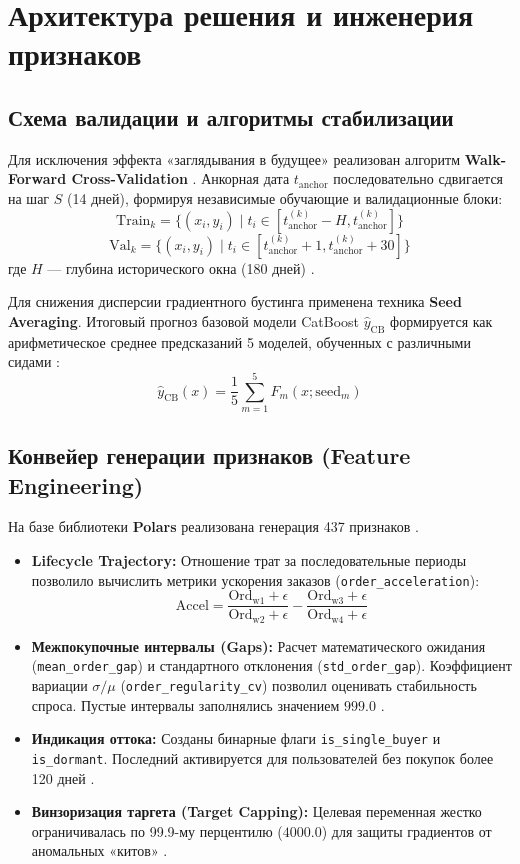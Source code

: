 \documentclass[12pt, a4paper]{article}
\begin{document}
	\section{Архитектура решения и инженерия признаков}
	
	\subsection{Схема валидации и алгоритмы стабилизации}
	Для исключения эффекта «заглядывания в будущее» реализован алгоритм \textbf{Walk-Forward Cross-Validation} \cite{ref:data}.
	Анкорная дата $t_{\text{anchor}}$ последовательно сдвигается на шаг $S$ (14 дней), формируя независимые обучающие и валидационные блоки:
	$$ \text{Train}_k = \{ (x_i, y_i) \mid t_i \in [t_{\text{anchor}}^{(k)} - H, t_{\text{anchor}}^{(k)}] \} $$
	$$ \text{Val}_k = \{ (x_i, y_i) \mid t_i \in [t_{\text{anchor}}^{(k)} + 1, t_{\text{anchor}}^{(k)} + 30] \} $$
	где $H$ — глубина исторического окна (180 дней) \cite{ref:data}.
	
	Для снижения дисперсии градиентного бустинга применена техника \textbf{Seed Averaging}. Итоговый прогноз базовой модели CatBoost $\hat{y}_{\text{CB}}$ формируется как арифметическое среднее предсказаний 5 моделей, обученных с различными сидами \cite{ref:train}:
	$$ \hat{y}_{\text{CB}}(x) = \frac{1}{5} \sum_{m=1}^5 F_m(x; \text{seed}_m) $$
	
	\subsection{Конвейер генерации признаков (Feature Engineering)}
	На базе библиотеки \textbf{Polars} реализована генерация 437 признаков \cite{ref:data}. 
	
	\begin{itemize}
		\item \textbf{Lifecycle Trajectory:} Отношение трат за последовательные периоды позволило вычислить метрики ускорения заказов (\texttt{order\_acceleration}):
		$$ \text{Accel} = \frac{\text{Ord}_{\text{w1}} + \epsilon}{\text{Ord}_{\text{w2}} + \epsilon} - \frac{\text{Ord}_{\text{w3}} + \epsilon}{\text{Ord}_{\text{w4}} + \epsilon} $$
		\item \textbf{Межпокупочные интервалы (Gaps):} Расчет математического ожидания (\texttt{mean\_order\_gap}) и стандартного отклонения (\texttt{std\_order\_gap}). Коэффициент вариации $\sigma / \mu$ (\texttt{order\_regularity\_cv}) позволил оценивать стабильность спроса. Пустые интервалы заполнялись значением $999.0$ \cite{ref:data}.
		\item \textbf{Индикация оттока:} Созданы бинарные флаги \texttt{is\_single\_buyer} и \texttt{is\_dormant}. Последний активируется для пользователей без покупок более 120 дней \cite{ref:data}.
		\item \textbf{Винзоризация таргета (Target Capping):} Целевая переменная жестко ограничивалась по 99.9-му перцентилю ($4000.0$) для защиты градиентов от аномальных «китов» \cite{ref:data}.
	\end{itemize}
	
\end{document}
